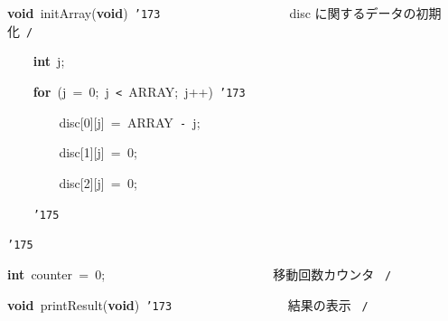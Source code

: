 \documentclass[a4paper,10pt]{article}
\def\mc{\relax}
\begin{document}
\noindent
\mbox{}\hfill

\noindent
\mbox{}\textbf{void}{\tt\mc \ }initArray(\textbf{void}){\tt\mc \ }{\tt\char'173}{\tt\mc \ }{\tt\mc \ }{\tt\mc \ }{\tt\mc \ }{\tt\mc \ }{\tt\mc \ }{\tt\mc \ }{\tt\mc \ }{\tt\mc \ }{\tt\mc \ }{\tt\mc \ }{\tt\mc \ }{\tt\mc \ }{\tt\mc \ }{\tt\mc \ }{\tt\mc \ }{\tt\mc \ }{\tt\mc \ }\rm\mc {\tt /}{\tt *}\  \ disc に関するデータの初期化\hfill \rm\mc \ {\tt *}{\tt /}
\tt\mc 

\noindent
\mbox{}{\tt\mc \ }{\tt\mc \ }{\tt\mc \ }{\tt\mc \ }\textbf{int}{\tt\mc \ }j;

\noindent
\mbox{}\hfill

\noindent
\mbox{}{\tt\mc \ }{\tt\mc \ }{\tt\mc \ }{\tt\mc \ }\textbf{for}{\tt\mc \ }(j{\tt\mc \ }={\tt\mc \ }0;{\tt\mc \ }j{\tt\mc \ }{\tt <}{\tt\mc \ }ARRAY;{\tt\mc \ }j++){\tt\mc \ }{\tt\char'173}

\noindent
\mbox{}{\tt\mc \ }{\tt\mc \ }{\tt\mc \ }{\tt\mc \ }{\tt\mc \ }{\tt\mc \ }{\tt\mc \ }{\tt\mc \ }disc[0][j]{\tt\mc \ }={\tt\mc \ }ARRAY{\tt\mc \ }{\tt -}{\tt\mc \ }j;

\noindent
\mbox{}{\tt\mc \ }{\tt\mc \ }{\tt\mc \ }{\tt\mc \ }{\tt\mc \ }{\tt\mc \ }{\tt\mc \ }{\tt\mc \ }disc[1][j]{\tt\mc \ }={\tt\mc \ }0;

\noindent
\mbox{}{\tt\mc \ }{\tt\mc \ }{\tt\mc \ }{\tt\mc \ }{\tt\mc \ }{\tt\mc \ }{\tt\mc \ }{\tt\mc \ }disc[2][j]{\tt\mc \ }={\tt\mc \ }0;

\noindent
\mbox{}{\tt\mc \ }{\tt\mc \ }{\tt\mc \ }{\tt\mc \ }{\tt\char'175}

\noindent
\mbox{}{\tt\char'175}

\noindent
\mbox{}\hfill

\noindent
\mbox{}\textbf{int}{\tt\mc \ }counter{\tt\mc \ }={\tt\mc \ }0;{\tt\mc \ }{\tt\mc \ }{\tt\mc \ }{\tt\mc \ }{\tt\mc \ }{\tt\mc \ }{\tt\mc \ }{\tt\mc \ }{\tt\mc \ }{\tt\mc \ }{\tt\mc \ }{\tt\mc \ }{\tt\mc \ }{\tt\mc \ }{\tt\mc \ }{\tt\mc \ }{\tt\mc \ }{\tt\mc \ }{\tt\mc \ }{\tt\mc \ }{\tt\mc \ }{\tt\mc \ }{\tt\mc \ }{\tt\mc \ }\rm\mc {\tt /}{\tt *}\  \ 移動回数カウンタ \hfill \rm\mc \ {\tt *}{\tt /}
\tt\mc 

\noindent
\mbox{}\hfill

\noindent
\mbox{}\textbf{void}{\tt\mc \ }printResult(\textbf{void}){\tt\mc \ }{\tt\char'173}{\tt\mc \ }{\tt\mc \ }{\tt\mc \ }{\tt\mc \ }{\tt\mc \ }{\tt\mc \ }{\tt\mc \ }{\tt\mc \ }{\tt\mc \ }{\tt\mc \ }{\tt\mc \ }{\tt\mc \ }{\tt\mc \ }{\tt\mc \ }{\tt\mc \ }{\tt\mc \ }\rm\mc {\tt /}{\tt *}\  \ 結果の表示 \hfill \rm\mc \ {\tt *}{\tt /}
\tt\mc 
\end{document}
